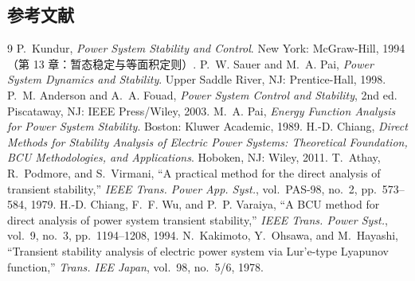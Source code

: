\subsection{参考文献}
\begin{thebibliography}{9}\small
{} P.~Kundur, \emph{Power System Stability and Control}.
  New York: McGraw-Hill, 1994（第 13 章：暂态稳定与等面积定则）.
 P.~W. Sauer and M.~A. Pai, \emph{Power System Dynamics and Stability}.
  Upper Saddle River, NJ: Prentice-Hall, 1998.
 P.~M. Anderson and A.~A. Fouad, \emph{Power System Control and Stability},
  2nd ed. Piscataway, NJ: IEEE Press/Wiley, 2003.
 M.~A. Pai, \emph{Energy Function Analysis for Power System Stability}.
  Boston: Kluwer Academic, 1989.
 H.-D. Chiang, \emph{Direct Methods for Stability Analysis of Electric Power
  Systems: Theoretical Foundation, BCU Methodologies, and Applications}. Hoboken, NJ: Wiley, 2011.
 T.~Athay, R.~Podmore, and S.~Virmani, ``A practical method for the direct
  analysis of transient stability,'' \emph{IEEE Trans. Power App. Syst.}, vol.~PAS-98, no.~2,
  pp.~573--584, 1979.
 H.-D. Chiang, F.~F. Wu, and P.~P. Varaiya, ``A BCU method for direct analysis of
  power system transient stability,'' \emph{IEEE Trans. Power Syst.}, vol.~9, no.~3,
  pp.~1194--1208, 1994.
 N.~Kakimoto, Y.~Ohsawa, and M.~Hayashi, ``Transient stability analysis of
  electric power system via Lur'e-type Lyapunov function,'' \emph{Trans. IEE Japan},
  vol.~98, no.~5/6, 1978.
\end{thebibliography}
